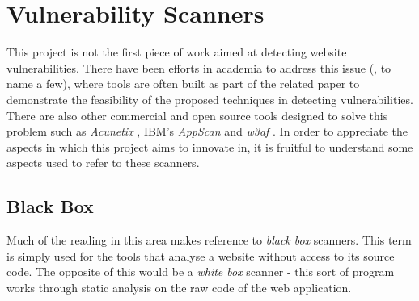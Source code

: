 \section{Vulnerability Scanners}

This project is not the first piece of work aimed at detecting website vulnerabilities. There have been efforts in academia to address this issue (\cite{Saner, Waler, Kals:2006:SWV:1135777.1135817, stateAwareBlackBoxWebVulnScanner}, to name a few), where tools are often built as part of the related paper to demonstrate the feasibility of the proposed techniques in detecting vulnerabilities. There are also other commercial and open source tools designed to solve this problem such as \textit{Acunetix} \cite{acunetix}, IBM's \textit{AppScan} \cite{appscan} and \textit{w3af} \cite{w3af}. In order to appreciate the aspects in which this project aims to innovate in, it is fruitful to understand some aspects used to refer to these scanners.

\subsection{Black Box}

Much of the reading in this area makes reference to \textit{black box} scanners. This term is simply used for the tools that analyse a website without access to its source code. The opposite of this would be a \textit{white box} scanner - this sort of program works through static analysis on the raw code of the web application.

